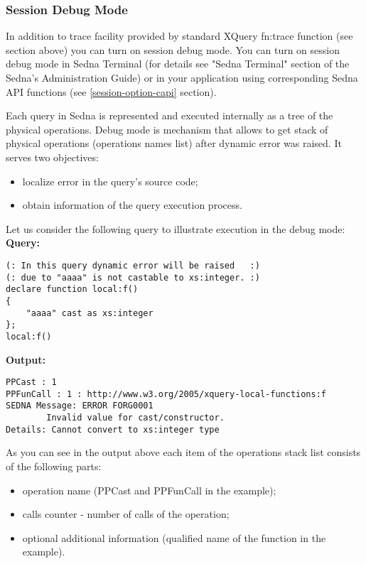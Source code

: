 \documentclass[a4paper,12pt]{article}
\begin{document}
\subsubsection{Session Debug Mode}
\label{session-debug-mode}
In addition to trace facility provided by standard XQuery fn:trace function (see section above) you can turn on session debug mode. You can turn on session debug mode in Sedna Terminal (for details see "Sedna Terminal" section of the Sedna's Administration Guide) or in your application using corresponding Sedna API functions (see \ref{session-option-capi} section).

Each query in Sedna is represented and executed internally as a tree of the physical operations. Debug mode is mechanism that allows to get stack of physical operations (operations names list) after dynamic error was raised. It serves two objectives:

\begin{itemize}
\item localize error in the query's source code;
\item obtain information of the query execution process.
\end{itemize}

Let us consider the following query to illustrate execution in the debug mode:
\newline
\newline
\textbf{Query:}

\begin{verbatim}
(: In this query dynamic error will be raised   :)
(: due to "aaaa" is not castable to xs:integer. :)
declare function local:f()
{
    "aaaa" cast as xs:integer
};
local:f()
\end{verbatim}
\textbf{Output:}

\begin{verbatim}
PPCast : 1
PPFunCall : 1 : http://www.w3.org/2005/xquery-local-functions:f
SEDNA Message: ERROR FORG0001
        Invalid value for cast/constructor.
Details: Cannot convert to xs:integer type
\end{verbatim}

As you can see in the output above each item of the operations stack list consists of the following parts:

\begin{itemize}
\item operation name (PPCast and PPFunCall in the example);
\item calls counter - number of calls of the operation;
\item optional additional information (qualified name of the function in the example).
\end{itemize}
\end{document}
